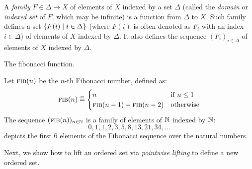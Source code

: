 A \emph{family} $F \in \Delta \to X$ of elements of $X$ indexed by a set $\Delta$ (called the \emph{domain} or \emph{indexed set} of $F$, which may be infinite) is a function from $\Delta$ to $X$. Such family defines a set $\{F(i) \mid i \in \Delta\}$ (where $F(i)$ is often denoted as $F_i$ with an index $i\in\Delta$) of elements of $X$ indexed by $\Delta$.
It also defines the sequence $(F_i)_{i\in\Delta}$ of elements of $X$ indexed by $\Delta$.

\begin{marginfigure}
  \caption{The fibonacci function.}
  \end{marginfigure}

\begin{example}
  Let $\textsc{fib}(n)$ be the $n$-th Fibonacci number, defined as:
  \begin{align*}
    \textsc{fib}(n) \defeq \begin{cases}
      n & \text{if } n \le 1 \\
      \textsc{fib}(n-1) + \textsc{fib}(n-2) & \text{otherwise}
    \end{cases}
  \end{align*}
  The sequence $(\textsc{fib}(n))_{n\in\mathbb{N}}$ is a family of elements of $\mathbb{N}$ indexed by $\mathbb{N}$:
  \[ 0, 1, 1, 2, 3, 5, 8, 13, 21, 34, \ldots \]
   depicts the first 6 elements of the Fibonacci sequence over the natural numbers.
\end{example}

Next, we show how to lift an ordered set via \emph{pointwise lifting} to define a new ordered set.

